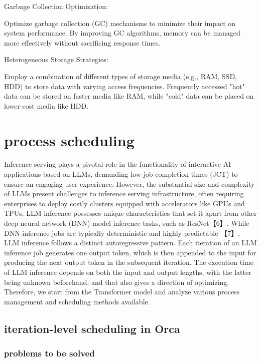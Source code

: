 \documentclass[conference]{IEEEtran}
\begin{document}
Garbage Collection Optimization:

Optimize garbage collection (GC) mechanisms to minimize their impact on system performance. By improving GC algorithms, memory can be managed more effectively without sacrificing response times.

Heterogeneous Storage Strategies:

Employ a combination of different types of storage media (e.g., RAM, SSD, HDD) to store data with varying access frequencies. Frequently accessed "hot" data can be stored on faster media like RAM, while "cold" data can be placed on lower-cost media like HDD.



\section{process scheduling}

Inference serving plays a pivotal role in the functionality of interactive AI applications based on LLMs, demanding low job completion times (JCT) to ensure an engaging user experience. However, the substantial size and complexity of LLMs present challenges to inference serving infrastructure, often requiring enterprises to deploy costly clusters equipped with accelerators like GPUs and TPUs. LLM inference possesses unique characteristics that set it apart from other deep neural network (DNN) model inference tasks, such as ResNet【6】. While DNN inference jobs are typically deterministic and highly predictable 【7】, LLM inference follows a distinct autoregressive pattern. Each iteration of an LLM inference job generates one output token, which is then appended to the input for producing the next output token in the subsequent iteration. The execution time of LLM inference depends on both the input and output lengths, with the latter being unknown beforehand, and that also gives a direction of optimizing.
Therefore, we start from the Transformer model and analyze various process management and scheduling methods available.


\subsection{iteration-level scheduling in Orca}
\subsubsection{problems to be solved}
\end{document}
